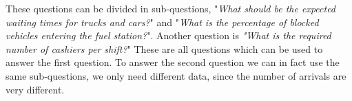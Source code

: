 These questions can be divided in sub-questions, "\textit{What should be the expected waiting times for trucks and cars?}" and "\textit{What is the percentage of blocked vehicles entering the fuel station?}". 
Another question is \textit{"What is the required number of cashiers per shift?}"
These are all questions which can be used to answer the first question. 
To answer the second question we can in fact use the same sub-questions, we only need different data, since the number of arrivals are very different. 
